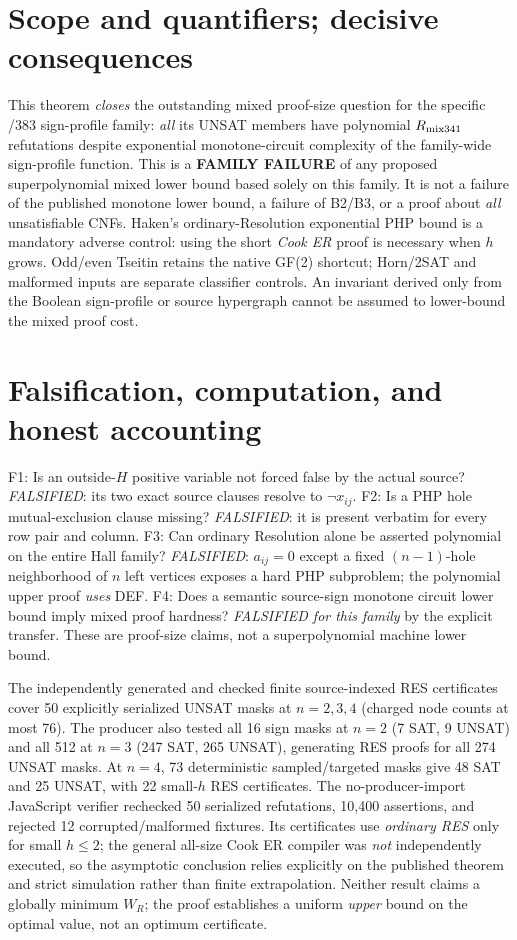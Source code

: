 \documentclass[11pt]{article}
\begin{document}
\section*{Scope and quantifiers; decisive consequences}
This theorem \emph{closes} the outstanding mixed proof-size question for the specific /383 sign-profile family: \emph{all} its UNSAT members have polynomial $R_{\rm mix341}$ refutations despite exponential monotone-circuit complexity of the family-wide sign-profile function. This is a \textbf{FAMILY FAILURE} of any proposed superpolynomial mixed lower bound based solely on this family. It is not a failure of the published monotone lower bound, a failure of B2/B3, or a proof about \emph{all} unsatisfiable CNFs. Haken's ordinary-Resolution exponential PHP bound is a mandatory adverse control: using the short \emph{Cook ER} proof is necessary when $h$ grows. Odd/even Tseitin retains the native GF(2) shortcut; Horn/2SAT and malformed inputs are separate classifier controls. An invariant derived only from the Boolean sign-profile or source hypergraph cannot be assumed to lower-bound the mixed proof cost.

\section*{Falsification, computation, and honest accounting}
F1: Is an outside-$H$ positive variable not forced false by the actual source? \emph{FALSIFIED}: its two exact source clauses resolve to $\neg x_{ij}$. F2: Is a PHP hole mutual-exclusion clause missing? \emph{FALSIFIED}: it is present verbatim for every row pair and column. F3: Can ordinary Resolution alone be asserted polynomial on the entire Hall family? \emph{FALSIFIED}: $a_{ij}=0$ except a fixed $(n-1)$-hole neighborhood of $n$ left vertices exposes a hard PHP subproblem; the polynomial upper proof \emph{uses} DEF. F4: Does a semantic source-sign monotone circuit lower bound imply mixed proof hardness? \emph{FALSIFIED for this family} by the explicit transfer. These are proof-size claims, not a superpolynomial machine lower bound.

The independently generated and checked finite source-indexed RES certificates cover 50 explicitly serialized UNSAT masks at $n=2,3,4$ (charged node counts at most 76). The producer also tested all 16 sign masks at $n=2$ (7 SAT, 9 UNSAT) and all 512 at $n=3$ (247 SAT, 265 UNSAT), generating RES proofs for all 274 UNSAT masks. At $n=4$, 73 deterministic sampled/targeted masks give 48 SAT and 25 UNSAT, with 22 small-$h$ RES certificates. The no-producer-import JavaScript verifier rechecked 50 serialized refutations, 10,400 assertions, and rejected 12 corrupted/malformed fixtures. Its certificates use \emph{ordinary RES} only for small $h\le2$; the general all-size Cook ER compiler was \emph{not} independently executed, so the asymptotic conclusion relies explicitly on the published theorem and strict simulation rather than finite extrapolation. Neither result claims a globally minimum $W_R$; the proof establishes a uniform \emph{upper} bound on the optimal value, not an optimum certificate.
\end{document}
